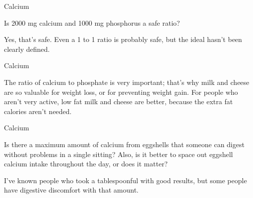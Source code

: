 \documentclass[11pt,oneside,openany,extrafontsizes]{memoir}
\begin{document}
\begin{qaexchange}{Calcium}

    \begin{question}
        Is 2000 mg calcium and 1000 mg phosphorus a safe ratio?
    \end{question}

    \begin{answer}
        Yes, that's safe. Even a 1 to 1 ratio is probably safe, but the ideal hasn't been clearly defined.
    \end{answer}
\end{qaexchange}

\begin{standalonequote}{Calcium}

    \begin{answer}
        The ratio of calcium to phosphate is very important; that's why milk and cheese are so valuable for weight loss, or for preventing weight gain. For people who aren't very active, low fat milk and cheese are better, because the extra fat calories aren't needed.
    \end{answer}
\end{standalonequote}

\begin{qaexchange}{Calcium}

    \begin{question}
        Is there a maximum amount of calcium from eggshells that someone can digest without problems in a single sitting? Also, is it better to space out eggshell calcium intake throughout the day, or does it matter?
    \end{question}

    \begin{answer}
        I've known people who took a tablespoonful with good results, but some people have digestive discomfort with that amount.
    \end{answer}
\end{qaexchange}
\end{document}
